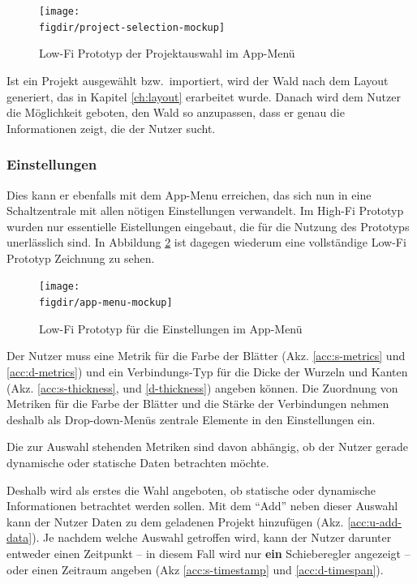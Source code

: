 \begin{figure}[htb]
  \texttt{[image: \\figdir/project-selection-mockup]}
  \caption{Low-Fi Prototyp der Projektauswahl im App-Menü}
  \label{fig:project-selection-mockup}
\end{figure}

Ist ein Projekt ausgewählt bzw.\ importiert, wird der Wald nach dem Layout generiert, das in Kapitel \ref{ch:layout} erarbeitet wurde. Danach wird dem Nutzer die Möglichkeit geboten, den Wald so anzupassen, dass er genau die Informationen zeigt, die der Nutzer sucht.

\subsubsection*{Einstellungen}

Dies kann er ebenfalls mit dem App-Menu erreichen, das sich nun in eine Schaltzentrale mit allen nötigen Einstellungen verwandelt. Im High-Fi Prototyp wurden nur essentielle Eistellungen eingebaut, die für die Nutzung des Prototyps unerlässlich sind. In Abbildung \ref{fig:settings} ist dagegen wiederum eine vollständige Low-Fi Prototyp Zeichnung zu sehen.

\begin{figure}[htb]
  \texttt{[image: \\figdir/app-menu-mockup]}
  \caption{Low-Fi Prototyp für die Einstellungen im App-Menü}
  \label{fig:settings}
\end{figure}

Der Nutzer muss eine Metrik für die Farbe der Blätter (Akz. \ref{acc:s-metrics} und \ref{acc:d-metrics}) und ein Verbindungs-Typ für die Dicke der Wurzeln und Kanten (Akz. \ref{acc:s-thickness},  und \ref{d-thickness}) angeben können. Die Zuordnung von Metriken für die Farbe der Blätter und die Stärke der Verbindungen nehmen deshalb als Drop-down-Menüs zentrale Elemente in den Einstellungen ein.

Die zur Auswahl stehenden Metriken sind davon abhängig, ob der Nutzer gerade dynamische oder statische Daten betrachten möchte.

Deshalb wird als erstes die Wahl angeboten, ob statische oder dynamische Informationen betrachtet werden sollen. Mit dem "`Add"' neben dieser Auswahl kann der Nutzer Daten zu dem geladenen Projekt hinzufügen (Akz. \ref{acc:u-add-data}). Je nachdem welche Auswahl getroffen wird, kann der Nutzer darunter entweder einen Zeitpunkt -- in diesem Fall wird nur \textbf{ein} Schieberegler angezeigt -- oder einen Zeitraum angeben (Akz \ref{acc:s-timestamp} und \ref{acc:d-timespan}).

